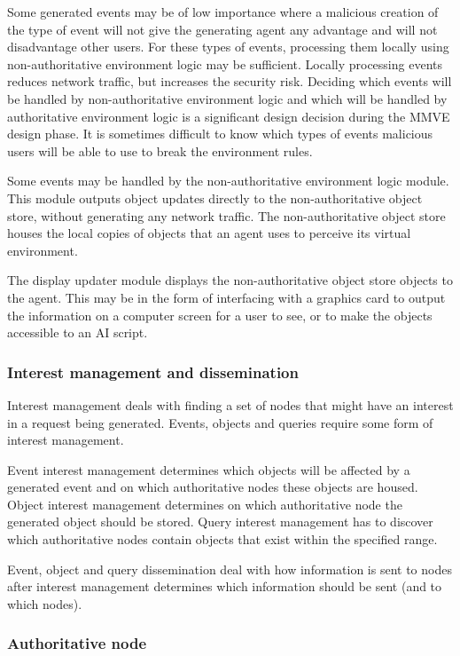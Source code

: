 Some generated events may be of low importance where a malicious creation of the type of event will not give the generating agent any advantage and will not disadvantage other users. For these types of events, processing them locally using non-authoritative environment logic may be sufficient. Locally processing events reduces network traffic, but increases the security risk. Deciding which events will be handled by non-authoritative environment logic and which will be handled by authoritative environment logic is a significant design decision during the MMVE design phase. It is sometimes difficult to know which types of events malicious users will be able to use to break the environment rules.

Some events may be handled by the non-authoritative environment logic module. This module outputs object updates directly to the non-authoritative object store, without generating any network traffic. The non-authoritative object store houses the local copies of objects that an agent uses to perceive its virtual environment.

The display updater module displays the non-authoritative object store objects to the agent. This may be in the form of interfacing with a graphics card to output the information on a computer screen for a user to see, or to make the objects accessible to an AI script.

\subsubsection{Interest management and dissemination}

Interest management deals with finding a set of nodes that might have an interest in a request being generated. Events, objects and queries require some form of interest management.

Event interest management determines which objects will be affected by a generated event and on which authoritative nodes these objects are housed. Object interest management determines on which authoritative node the generated object should be stored. Query interest management has to discover which authoritative nodes contain objects that exist within the specified range.

Event, object and query dissemination deal with how information is sent to nodes after interest management determines which information should be sent (and to which nodes).

\subsubsection{Authoritative node}

